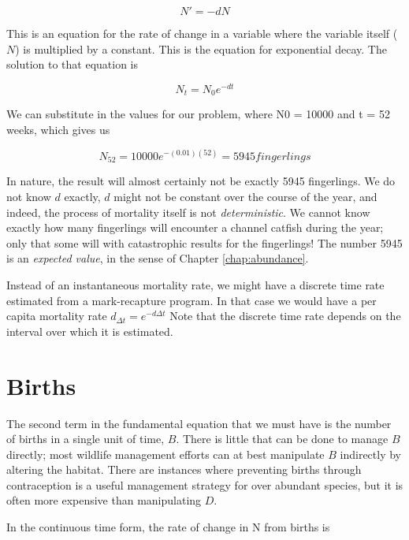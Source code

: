 \documentclass[]{book}
\begin{document}
\begin{equation*}
N' = - dN 
\end{equation*}

This is an equation for the rate of change in a variable where the
variable itself (\(N\)) is multiplied by a constant. This is the
equation for exponential decay. The solution to that equation is

\begin{equation*}
N_t = N_0 e^{-dt}
\label{eq:deaths}
\end{equation*}

We can substitute in the values for our problem, where N0 = 10000 and t
= 52 weeks, which gives us

\begin{equation*}
N_{52} = 10000 e^{-(0.01)(52)} = 5945 fingerlings
\end{equation*}

In nature, the result will almost certainly not be exactly 5945
fingerlings. We do not know \(d\) exactly, \(d\) might not be constant
over the course of the year, and indeed, the process of mortality itself
is not \emph{deterministic}. We cannot know exactly how many fingerlings
will encounter a channel catfish during the year; only that some will
with catastrophic results for the fingerlings! The number 5945 is an
\emph{expected value}, in the sense of Chapter \ref{chap:abundance}.

Instead of an instantaneous mortality rate, we might have a discrete
time rate estimated from a mark-recapture program. In that case we would
have a per capita mortality rate \(d_{\Delta t}=e^{-d \Delta t}\) Note
that the discrete time rate depends on the interval over which it is
estimated.

\section{Births}\label{births}

The second term in the fundamental equation that we must have is the
number of births in a single unit of time, \(B\). There is little that
can be done to manage \(B\) directly; most wildlife management efforts
can at best manipulate \(B\) indirectly by altering the habitat. There
are instances where preventing births through contraception is a useful
management strategy for over abundant species, but it is often more
expensive than manipulating \(D\).

In the continuous time form, the rate of change in N from births is
\end{document}
